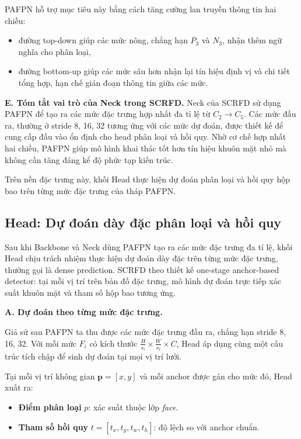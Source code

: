 PAFPN hỗ trợ mục tiêu này bằng cách tăng cường lan truyền thông tin hai chiều:
\begin{itemize}
  \item đường top-down giúp các mức nông, chẳng hạn $P_3$ và $N_3$, nhận thêm ngữ nghĩa cho phân loại,
  \item đường bottom-up giúp các mức sâu hơn nhận lại tín hiệu định vị và chi tiết tổng hợp, hạn chế gián đoạn thông tin giữa các mức.
\end{itemize}

\medskip
\noindent\textbf{E. Tóm tắt vai trò của Neck trong SCRFD.}
Neck của SCRFD sử dụng PAFPN để tạo ra các mức đặc trưng hợp nhất đa tỉ lệ từ $C_2 \rightarrow C_5$. 
Các mức đầu ra, thường ở stride 8, 16, 32 tương ứng với các mức dự đoán, được thiết kế để cung cấp đầu vào ổn định cho head phân loại và hồi quy. 
Nhờ cơ chế hợp nhất hai chiều, PAFPN giúp mô hình khai thác tốt hơn tín hiệu khuôn mặt nhỏ mà không cần tăng đáng kể độ phức tạp kiến trúc.

\medskip
\noindent
Trên nền đặc trưng này, khối Head thực hiện dự đoán phân loại và hồi quy hộp bao trên từng mức đặc trưng của tháp PAFPN.

\subsection{Head: Dự đoán dày đặc phân loại và hồi quy}

Sau khi Backbone và Neck dùng PAFPN tạo ra các mức đặc trưng đa tỉ lệ, khối Head chịu trách nhiệm thực hiện dự đoán dày đặc trên từng mức đặc trưng, thường gọi là dense prediction. 
SCRFD theo thiết kế one-stage anchor-based detector: tại mỗi vị trí trên bản đồ đặc trưng, mô hình dự đoán trực tiếp xác suất khuôn mặt và tham số hộp bao tương ứng.

\medskip
\noindent\textbf{A. Dự đoán theo từng mức đặc trưng.}

Giả sử sau PAFPN ta thu được các mức đặc trưng đầu ra, chẳng hạn stride 8, 16, 32. 
Với mỗi mức $F_i$ có kích thước $\frac{H}{s_i} \times \frac{W}{s_i} \times C$, Head áp dụng cùng một cấu trúc tích chập để sinh dự đoán tại mọi vị trí lưới.

Tại mỗi vị trí không gian $\mathbf{p} = [x, y]$ và mỗi anchor được gán cho mức đó, Head xuất ra:

\begin{itemize}
  \item \textbf{Điểm phân loại} $p$: xác suất thuộc lớp \textit{face}.
  \item \textbf{Tham số hồi quy} $t = [t_x, t_y, t_w, t_h]$: độ lệch so với anchor chuẩn.
\end{itemize}

